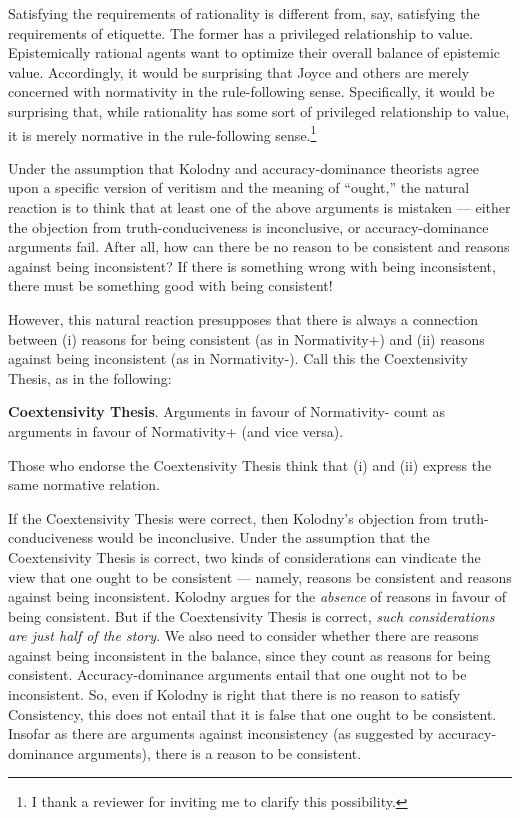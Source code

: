 \documentclass[
]{article}
\begin{document}
\noindent Satisfying the requirements of rationality is different from,
say, satisfying the requirements of etiquette. The former has a
privileged relationship to value. Epistemically rational agents want to
optimize their overall balance of epistemic value. Accordingly, it would
be surprising that Joyce and others are merely concerned with
normativity in the rule-following sense. Specifically, it would be
surprising that, while rationality has some sort of privileged
relationship to value, it is merely normative in the rule-following
sense.\footnote{I thank a reviewer for inviting me to clarify this
  possibility.}

Under the assumption that Kolodny and accuracy-dominance theorists agree
upon a specific version of veritism and the meaning of ``ought,'' the
natural reaction is to think that at least one of the above arguments is
mistaken --- either the objection from truth-conduciveness is
inconclusive, or accuracy-dominance arguments fail. After all, how can
there be no reason to be consistent and reasons against being
inconsistent? If there is something wrong with being inconsistent, there
must be something good with being consistent!

However, this natural reaction presupposes that there is always a
connection between (i) reasons for being consistent (as in Normativity+)
and (ii) reasons against being inconsistent (as in Normativity-). Call
this the Coextensivity Thesis, as in the following:

\textbf{Coextensivity Thesis}. Arguments in favour of Normativity- count
as arguments in favour of Normativity+ (and vice versa).

\noindent Those who endorse the Coextensivity Thesis think that (i) and
(ii) express the same normative relation.

If the Coextensivity Thesis were correct, then Kolodny's objection from
truth-conduciveness would be inconclusive. Under the assumption that the
Coextensivity Thesis is correct, two kinds of considerations can
vindicate the view that one ought to be consistent --- namely, reasons
be consistent and reasons against being inconsistent. Kolodny argues for
the \emph{absence} of reasons in favour of being consistent. But if the
Coextensivity Thesis is correct, \emph{such considerations are just half
of the story}. We also need to consider whether there are reasons
against being inconsistent in the balance, since they count as reasons
for being consistent. Accuracy-dominance arguments entail that one ought
not to be inconsistent. So, even if Kolodny is right that there is no
reason to satisfy Consistency, this does not entail that it is false
that one ought to be consistent. Insofar as there are arguments against
inconsistency (as suggested by accuracy-dominance arguments), there is a
reason to be consistent.
\end{document}
